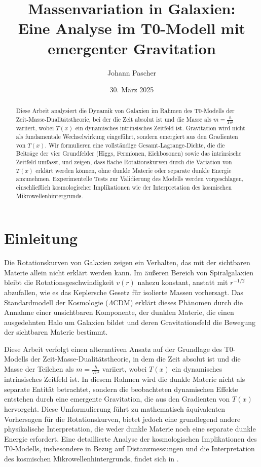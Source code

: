 \documentclass[a4paper,12pt]{article}
\newcommand{\Tfield}{T(x)}
\begin{document}
	
	\title{Massenvariation in Galaxien: \\Eine Analyse im T0-Modell mit emergenter Gravitation}
	\author{Johann Pascher}
	\date{30. März 2025}
	\maketitle
	
	\begin{abstract}
		Diese Arbeit analysiert die Dynamik von Galaxien im Rahmen des T0-Modells der Zeit-Masse-Dualitätstheorie, bei der die Zeit absolut ist und die Masse als \( m = \frac{\hbar}{T c^2} \) variiert, wobei \( \Tfield \) ein dynamisches intrinsisches Zeitfeld ist. Gravitation wird nicht als fundamentale Wechselwirkung eingeführt, sondern emergiert aus den Gradienten von \( \Tfield \). Wir formulieren eine vollständige Gesamt-Lagrange-Dichte, die die Beiträge der vier Grundfelder (Higgs, Fermionen, Eichbosonen) sowie das intrinsische Zeitfeld umfasst, und zeigen, dass flache Rotationskurven durch die Variation von \( \Tfield \) erklärt werden können, ohne dunkle Materie oder separate dunkle Energie anzunehmen. Experimentelle Tests zur Validierung des Modells werden vorgeschlagen, einschließlich kosmologischer Implikationen wie der Interpretation des kosmischen Mikrowellenhintergrunds.
	\end{abstract}
	
	\tableofcontents
	\newpage
	
	\section{Einleitung}
	
	Die Rotationskurven von Galaxien zeigen ein Verhalten, das mit der sichtbaren Materie allein nicht erklärt werden kann. Im äußeren Bereich von Spiralgalaxien bleibt die Rotationsgeschwindigkeit \( v(r) \) nahezu konstant, anstatt mit \( r^{-1/2} \) abzufallen, wie es das Keplersche Gesetz für isolierte Massen vorhersagt. Das Standardmodell der Kosmologie (\(\Lambda\)CDM) erklärt dieses Phänomen durch die Annahme einer unsichtbaren Komponente, der dunklen Materie, die einen ausgedehnten Halo um Galaxien bildet und deren Gravitationsfeld die Bewegung der sichtbaren Materie bestimmt.
	
	Diese Arbeit verfolgt einen alternativen Ansatz auf der Grundlage des T0-Modells der Zeit-Masse-Dualitätstheorie, in dem die Zeit absolut ist und die Masse der Teilchen als \( m = \frac{\hbar}{T c^2} \) variiert, wobei \( \Tfield \) ein dynamisches intrinsisches Zeitfeld ist. In diesem Rahmen wird die dunkle Materie nicht als separate Entität betrachtet, sondern die beobachteten dynamischen Effekte entstehen durch eine emergente Gravitation, die aus den Gradienten von \( \Tfield \) hervorgeht. Diese Umformulierung führt zu mathematisch äquivalenten Vorhersagen für die Rotationskurven, bietet jedoch eine grundlegend andere physikalische Interpretation, die weder dunkle Materie noch eine separate dunkle Energie erfordert. Eine detaillierte Analyse der kosmologischen Implikationen des T0-Modells, insbesondere in Bezug auf Distanzmessungen und die Interpretation des kosmischen Mikrowellenhintergrunds, findet sich in \cite{pascher_messdifferenzen_2025}.
	
\end{document}
